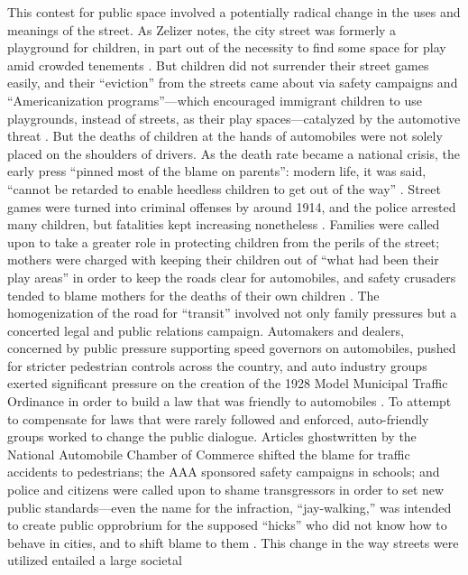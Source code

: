 This contest for public space involved a potentially radical change in
the uses and meanings of the street. As Zelizer notes, the city street
was formerly a playground for children, in part out of the necessity
to find some space for play amid crowded tenements \cite[p.
  33]{zelizer}. But children did not surrender their street games
easily, and their ``eviction'' from the streets came about via safety
campaigns and ``Americanization programs''---which encouraged
immigrant children to use playgrounds, instead of streets, as their
play spaces---catalyzed by the automotive threat \cite[p.
  35]{zelizer}. But the deaths of children at the hands of
automobiles were not solely placed on the shoulders of drivers. As the
death rate became a national crisis, the
early press ``pinned most of the blame on parents'': modern life, it
was said, ``cannot be retarded to enable heedless children to get out
of the way'' \cite[p. 37]{zelizer}. Street games were turned into
criminal offenses by around 1914, and the police arrested many
children, but fatalities kept increasing nonetheless \cite[p.
  38]{zelizer}. Families were called upon to take a greater role
in protecting children from the perils of the street; mothers were
charged with keeping their children out of ``what had been their play
areas'' in order to keep the roads clear for automobiles, and safety
crusaders tended to blame mothers for the deaths of their own
children \cite[p. 73]{lochlannjain}. The homogenization of the road
for ``transit'' \cite[p. 73]{lochlannjain} involved not only
family pressures but a concerted legal and public relations campaign. Automakers
and dealers, concerned by public pressure supporting speed governors on
automobiles, pushed for stricter pedestrian controls across the country, and
auto industry groups exerted significant pressure on the creation of
the 1928 Model Municipal Traffic Ordinance in order to build a law
that was friendly to automobiles \cite{voxNorton}. To attempt to
compensate for laws that were rarely followed and enforced,
auto-friendly groups worked to change the public dialogue. Articles
ghostwritten by the National Automobile Chamber of Commerce shifted
the blame for traffic accidents to pedestrians; the AAA sponsored
safety campaigns in schools; and police and citizens were called upon
to shame transgressors in order to set new public standards---even the
name for the infraction, ``jay-walking,'' was intended to create
public opprobrium for the supposed ``hicks'' who did not know how to
behave in cities, and to shift blame to them \cite{voxNorton}. This
change in the way streets were utilized entailed a large societal
